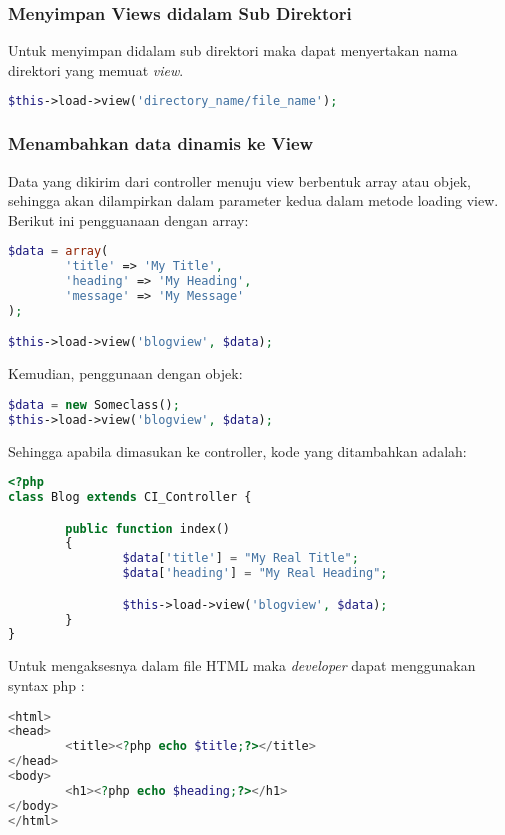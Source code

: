 \subsubsection{Menyimpan Views didalam Sub Direktori}

Untuk menyimpan didalam sub direktori maka dapat menyertakan nama direktori yang memuat \textit{view}.
\begin{lstlisting}[frame=single, language=PHP] 
$this->load->view('directory_name/file_name');
\end{lstlisting}

\subsubsection{Menambahkan data dinamis ke View}

Data yang dikirim dari controller menuju view berbentuk array atau objek, sehingga akan dilampirkan dalam parameter kedua dalam metode loading view.
Berikut ini pengguanaan dengan array:
\begin{lstlisting}[frame=single, language=PHP] 
$data = array(
        'title' => 'My Title',
        'heading' => 'My Heading',
        'message' => 'My Message'
);

$this->load->view('blogview', $data);
\end{lstlisting}

\noindent Kemudian, penggunaan dengan objek:
\begin{lstlisting}[frame=single, language=PHP] 
$data = new Someclass();
$this->load->view('blogview', $data);
\end{lstlisting}

\noindent Sehingga apabila dimasukan ke controller, kode yang ditambahkan adalah:
\begin{lstlisting}[frame=single, language=PHP] 
<?php
class Blog extends CI_Controller {

        public function index()
        {
                $data['title'] = "My Real Title";
                $data['heading'] = "My Real Heading";

                $this->load->view('blogview', $data);
        }
}
\end{lstlisting}

Untuk mengaksesnya dalam file HTML maka \textit{developer} dapat menggunakan syntax php :
\begin{lstlisting}[frame=single, language=PHP] 
<html>
<head>
        <title><?php echo $title;?></title>
</head>
<body>
        <h1><?php echo $heading;?></h1>
</body>
</html>
\end{lstlisting}

